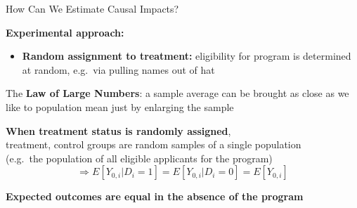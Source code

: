 \documentclass[10pt,xcolor=table,ignorenonframetext,handout,aspectratio=169]{beamer}
\newlength{\wideitemsep}
\let\olditem\item
\renewcommand{\item}{\setlength{\itemsep}{\wideitemsep}\olditem}
\begin{document}

\begin{frame}{How Can We Estimate Causal Impacts?}

\medskip
\textbf{Experimental approach:}

\medskip
\begin{itemize}
	
	\item \textbf{Random assignment to treatment:}  eligibility for program is determined at random, e.g.~via pulling names out of hat
	
\end{itemize}

\pause
\medskip
The \textbf{Law of Large Numbers}: a sample average can be brought as close as we like to population mean just by enlarging the sample

\pause
\medskip
\medskip
\textbf{When treatment status is randomly assigned}, \\
treatment, control groups are random samples of a single population \\
(e.g.~the population of all eligible applicants for the program)
\begin{equation*}
\Rightarrow E [ Y_{0,i} \vert D_i = 1] = E [ Y_{0,i} \vert D_i = 0] = E [ Y_{0,i} ]
\end{equation*}

\pause
\textbf{Expected outcomes are equal in the absence of the program}

\end{frame}


%
%
%
%
%
%
%	
%	
%
\end{document}
